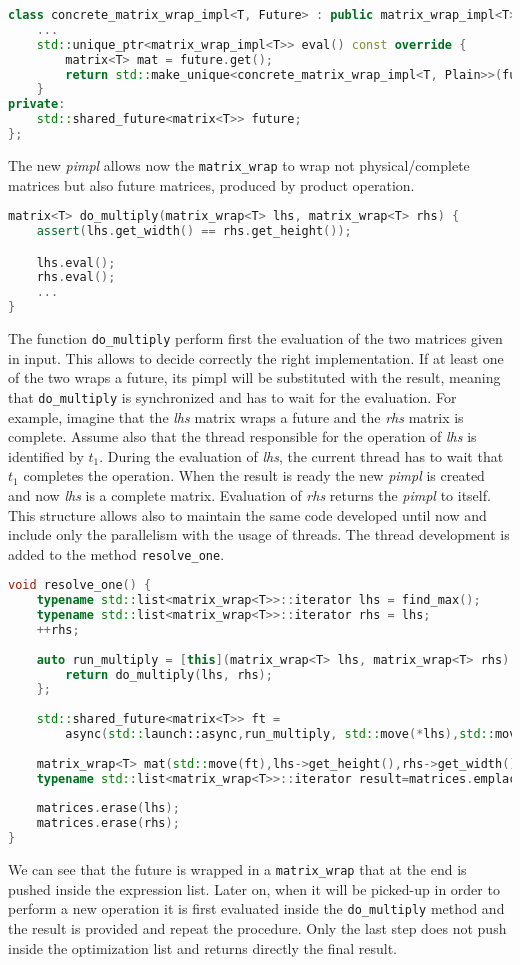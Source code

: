\documentclass[11pt,a4paper]{article}
\begin{document}
\begin{lstlisting}[language=C++]
class concrete_matrix_wrap_impl<T, Future> : public matrix_wrap_impl<T> {
	...
	std::unique_ptr<matrix_wrap_impl<T>> eval() const override {
		matrix<T> mat = future.get();
		return std::make_unique<concrete_matrix_wrap_impl<T, Plain>>(future.get());
	}
private:
	std::shared_future<matrix<T>> future;
};
\end{lstlisting}
The new \textit{pimpl} allows now the \verb|matrix_wrap| to wrap not physical/complete matrices but also future matrices, produced by product operation.

\begin{lstlisting}[language=C++]
matrix<T> do_multiply(matrix_wrap<T> lhs, matrix_wrap<T> rhs) {
	assert(lhs.get_width() == rhs.get_height());

	lhs.eval();
	rhs.eval();
	...
}
\end{lstlisting}
The function \verb|do_multiply| perform first the evaluation of the two matrices given in input. This allows to decide correctly the right implementation. If at least one of the two wraps a future, its pimpl will be substituted with the result, meaning that \verb|do_multiply| is synchronized and has to wait for the evaluation. For example, imagine that the \textit{lhs} matrix wraps a future and the \textit{rhs} matrix is complete. Assume also that the thread responsible for the operation of \textit{lhs} is identified by $t_1$. During the evaluation of \textit{lhs}, the current thread has to wait that $t_1$ completes the operation. When the result is ready the new \textit{pimpl} is created and now \textit{lhs} is a complete matrix. Evaluation of \textit{rhs} returns the \textit{pimpl} to itself. This structure allows also to maintain the same code developed until now and include only the parallelism with the usage of threads. The thread development is added to the method \verb|resolve_one|.
\begin{lstlisting}[language=C++]
void resolve_one() {
	typename std::list<matrix_wrap<T>>::iterator lhs = find_max();
	typename std::list<matrix_wrap<T>>::iterator rhs = lhs;
	++rhs;
	
	auto run_multiply = [this](matrix_wrap<T> lhs, matrix_wrap<T> rhs) {
		return do_multiply(lhs, rhs);
	};
	
	std::shared_future<matrix<T>> ft =
		async(std::launch::async,run_multiply, std::move(*lhs),std::move(*rhs));
	
	matrix_wrap<T> mat(std::move(ft),lhs->get_height(),rhs->get_width());
	typename std::list<matrix_wrap<T>>::iterator result=matrices.emplace(lhs,mat);
	
	matrices.erase(lhs);
	matrices.erase(rhs);
}
\end{lstlisting}
We can see that the future is wrapped in a \verb|matrix_wrap| that at the end is pushed inside the expression list. Later on, when it will be picked-up in order to perform a new operation it is first evaluated inside the \verb|do_multiply| method and the result is provided and repeat the procedure. Only the last step does not push inside the optimization list and returns directly the final result.
\end{document}
